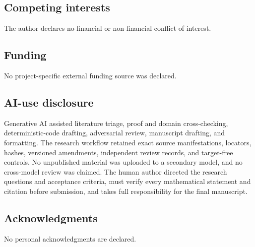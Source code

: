 \documentclass[11pt,a4paper]{article}
\theoremstyle{definition}
\begin{document}
\subsection*{Competing interests}
The author declares no financial or non-financial conflict of interest.

\subsection*{Funding}
No project-specific external funding source was declared.

\subsection*{AI-use disclosure}
Generative AI assisted literature triage, proof and domain cross-checking,
deterministic-code drafting, adversarial review, manuscript drafting, and
formatting.  The research workflow retained exact source manifestations,
locators, hashes, versioned amendments, independent review records, and
target-free controls.  No unpublished material was uploaded to a secondary
model, and no cross-model review was claimed.  The human author directed the
research questions and acceptance criteria, must verify every mathematical
statement and citation before submission, and takes full responsibility for
the final manuscript.

\subsection*{Acknowledgments}
No personal acknowledgments are declared.



\end{document}
